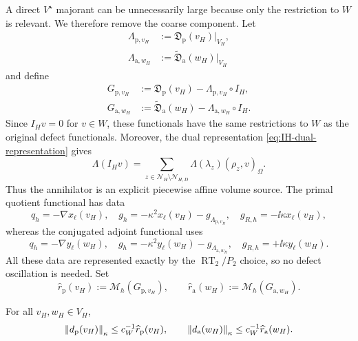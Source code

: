 A direct $V^\star$ majorant can be unnecessarily large because only the
restriction to $W$ is relevant.  We therefore remove the coarse component.
Let
\begin{align}
  \Lambda_{\mathrm p,v_H}
  &:=\mathfrak D_{\mathrm p}(v_H)|_{V_H},
  \label{eq:canonical-annihilator-p}\\
  \Lambda_{\mathrm a,w_H}
  &:=\widetilde{\mathfrak D}_{\mathrm a}(w_H)|_{V_H}
  \label{eq:canonical-annihilator-a}
\end{align}
and define
\begin{align}
  G_{\mathrm p,v_H}
  &:=\mathfrak D_{\mathrm p}(v_H)
     -\Lambda_{\mathrm p,v_H}\circ I_H,
  \label{eq:quotient-functional-p}\\
  G_{\mathrm a,w_H}
  &:=\widetilde{\mathfrak D}_{\mathrm a}(w_H)
     -\Lambda_{\mathrm a,w_H}\circ I_H.
  \label{eq:quotient-functional-a}
\end{align}
Since $I_Hv=0$ for $v\in W$, these functionals have the same restrictions
to $W$ as the original defect functionals.  Moreover, the dual
representation \eqref{eq:IH-dual-representation} gives
\begin{equation}
\label{eq:annihilator-volume-source}
  \Lambda(I_Hv)
  =\sum_{z\in\mathcal N_H\setminus\mathcal N_{H,D}}
    \Lambda(\lambda_z)(\rho_z,v)_\Omega.
\end{equation}
Thus the annihilator is an explicit piecewise affine volume source.  The
primal quotient functional has data
\begin{equation}
\label{eq:primal-defect-data}
  q_h=-\nabla x_\ell(v_H),
  \quad
  g_h=-\kappa^2x_\ell(v_H)-g_{\Lambda_{\mathrm p,v_H}},
  \quad
  g_{R,h}=-\ii\kappa x_\ell(v_H),
\end{equation}
whereas the conjugated adjoint functional uses
\begin{equation}
\label{eq:adjoint-defect-data}
  q_h=-\nabla y_\ell(w_H),
  \quad
  g_h=-\kappa^2y_\ell(w_H)-g_{\Lambda_{\mathrm a,w_H}},
  \quad
  g_{R,h}=+\ii\kappa y_\ell(w_H).
\end{equation}
All these data are represented exactly by the $\operatorname{RT}_2/P_2$
choice, so no defect oscillation is needed.  Set
\begin{equation}
\label{eq:defect-majorants}
  \widehat r_{\mathrm p}(v_H)
  :=\mathscr M_h(G_{\mathrm p,v_H}),
  \qquad
  \widehat r_{\mathrm a}(w_H)
  :=\mathscr M_h(G_{\mathrm a,w_H}).
\end{equation}

\begin{proposition}
\label{prop:certified-total-defects}
For all $v_H,w_H\in V_H$,
\begin{equation}
\label{eq:pointwise-total-defect-bounds}
  \left\lVert d_{\mathrm p}(v_H)\right\rVert_\kappa
  \leq c_W^{-1}\widehat r_{\mathrm p}(v_H),
  \qquad
  \left\lVert d_{\mathrm a}(w_H)\right\rVert_\kappa
  \leq c_W^{-1}\widehat r_{\mathrm a}(w_H).
\end{equation}
\end{proposition}

